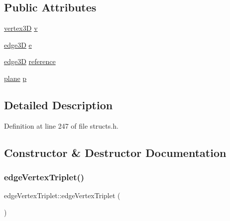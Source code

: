 \subsection*{Public Attributes}
\begin{DoxyCompactItemize}
\item 
\mbox{\hyperlink{structvertex3_d}{vertex3D}} \mbox{\hyperlink{structedge_vertex_triplet_aae5ca347902fd66a83bf45def3566692}{v}}
\item 
\mbox{\hyperlink{structedge3_d}{edge3D}} \mbox{\hyperlink{structedge_vertex_triplet_a9ccfd63a20315a1aebb2c4d873e3c045}{e}}
\item 
\mbox{\hyperlink{structedge3_d}{edge3D}} \mbox{\hyperlink{structedge_vertex_triplet_afe218b97c39b18b49d4c4e06e937a98f}{reference}}
\item 
\mbox{\hyperlink{structplane}{plane}} \mbox{\hyperlink{structedge_vertex_triplet_a6d523c5de722cb420c3515594be8fc0e}{p}}
\end{DoxyCompactItemize}


\subsection{Detailed Description}


Definition at line 247 of file structs.\+h.



\subsection{Constructor \& Destructor Documentation}
\mbox{\label{structedge_vertex_triplet_a794c00faebfea5c0bc0b44d7f1e7650c}} 
\subsubsection{\texorpdfstring{edge\+Vertex\+Triplet()}{edgeVertexTriplet()}\hspace{0.1cm}{\footnotesize\ttfamily [1/2]}}
{\footnotesize\ttfamily edge\+Vertex\+Triplet\+::edge\+Vertex\+Triplet (\begin{DoxyParamCaption}{ }\end{DoxyParamCaption})\hspace{0.3cm}{\ttfamily [inline]}}



